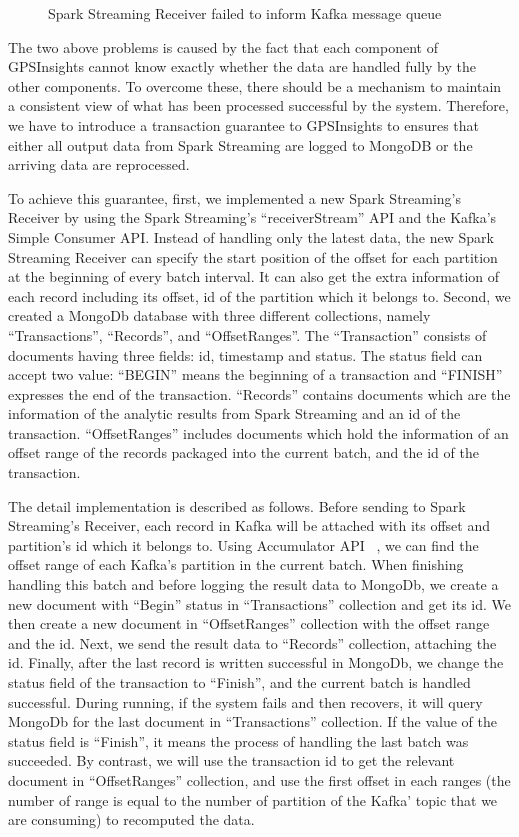 \documentclass{acm_proc_article-sp}
\begin{document}
\begin{figure}[h]
\centering
{}
\caption{Spark Streaming Receiver failed to inform Kafka message queue}
\label{fig:second-problem}
\end{figure} 

The two above problems is caused by the fact that each component of GPSInsights cannot know exactly whether the data are handled fully by the other components. To overcome these, there should be a mechanism to maintain a consistent view of what has been processed successful by the system. Therefore, we have to introduce a transaction guarantee to GPSInsights to ensures that either all output data from Spark Streaming are logged to MongoDB or the arriving data are reprocessed.

To achieve this guarantee, first, we implemented a new Spark Streaming's Receiver by using the Spark Streaming's ``receiverStream'' API and the Kafka's Simple Consumer API. Instead of handling only the latest data, the new Spark Streaming Receiver can specify the start position of the offset for each partition at the beginning of every batch interval. It can also get the extra information of each record including its offset, id of the partition which it belongs to. Second, we created a MongoDb database with three different collections, namely ``Transactions'', ``Records'', and ``OffsetRanges''. The ``Transaction'' consists of documents having three fields: id, timestamp and status. The status field can accept two value: ``BEGIN'' means the beginning of a transaction and ``FINISH'' expresses the end of the transaction. ``Records'' contains documents which are the information of the analytic results from Spark Streaming and an id of the transaction. ``OffsetRanges'' includes documents which hold the information of an offset range of the records packaged into the current batch, and the id of the transaction.

The detail implementation is described as follows. Before sending to Spark Streaming's Receiver, each record in Kafka will be attached with its offset and partition's id which it belongs to. Using Accumulator API ~\cite{accumulatorapi}, we can find the offset range of each Kafka's partition in the current batch. When finishing handling this batch and before logging the result data to MongoDb, we create a new document with ``Begin'' status in ``Transactions'' collection and get its id. We then create a new document in ``OffsetRanges'' collection with the offset range and the id. Next, we send the result data to ``Records'' collection, attaching the id. Finally, after the last record is written successful in MongoDb, we change the status field of the transaction to ``Finish'', and the current batch is handled successful. During running, if the system fails and then recovers, it will query MongoDb for the last document in ``Transactions'' collection.  If the value of the status field is ``Finish'', it means the process of handling the last batch was succeeded. By contrast, we will use the transaction id to get the relevant document in ``OffsetRanges'' collection, and use the first offset in each ranges (the number of range is equal to the number of partition of the Kafka' topic that we are consuming) to recomputed the data. 
\end{document}
